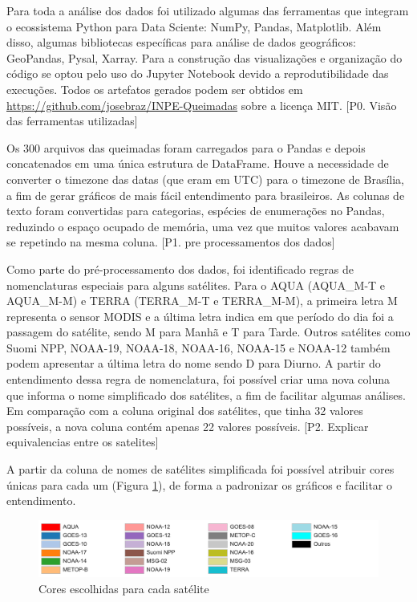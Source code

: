 \documentclass[cic,tc]{iiufrgs}
\begin{document}

Para toda a análise dos dados foi utilizado algumas das ferramentas que integram o 
ecossistema Python para Data Sciente: NumPy, Pandas, Matplotlib. Além disso, 
algumas bibliotecas específicas para análise de dados geográficos: GeoPandas, 
Pysal, Xarray. Para a construção das visualizações e organização do código se 
optou pelo uso do Jupyter Notebook devido a reprodutibilidade das execuções. 
Todos os artefatos gerados podem ser obtidos em 
\url{https://github.com/josebraz/INPE-Queimadas} sobre a licença MIT. 
[P0. Visão das ferramentas utilizadas]\par

Os 300 arquivos das queimadas foram carregados para o Pandas e depois concatenados
em uma única estrutura de DataFrame. Houve a necessidade de converter o timezone 
das datas (que eram em UTC) para o timezone de Brasília, a fim de gerar gráficos 
de mais fácil entendimento para brasileiros. As colunas de texto foram convertidas 
para categorias, espécies de enumerações no Pandas, reduzindo o espaço ocupado 
de memória, uma vez que muitos valores acabavam se repetindo na mesma coluna. 
[P1. pre processamentos dos dados]\par

Como parte do pré-processamento dos dados, foi identificado regras de nomenclaturas 
especiais para alguns satélites. Para o AQUA (AQUA\_M-T e AQUA\_M-M) e TERRA 
(TERRA\_M-T e TERRA\_M-M), a primeira letra M representa o sensor MODIS e a última
letra indica em que período do dia foi a passagem do satélite, sendo M para Manhã 
e T para Tarde. Outros satélites como Suomi NPP, NOAA-19, NOAA-18, NOAA-16, NOAA-15 
e NOAA-12 também podem apresentar a última letra do nome sendo D para Diurno.
A partir do entendimento dessa regra de nomenclatura, foi possível criar uma nova 
coluna que informa o nome simplificado dos satélites, a fim de facilitar 
algumas análises. Em comparação com a coluna original dos satélites, que tinha 32 
valores possíveis, a nova coluna contém apenas 22 valores possíveis.
[P2. Explicar equivalencias entre os satelites] \par

A partir da coluna de nomes de satélites simplificada foi possível atribuir cores 
únicas para cada um (Figura \ref{fig:cores_satelites}), de forma a padronizar os 
gráficos e facilitar o entendimento.

\begin{figure}
    \caption{Cores escolhidas para cada satélite}
    \begin{center}
        \includegraphics[width=35em]{cores_satelites}
    \end{center}
    \label{fig:cores_satelites}
\end{figure}
\end{document}
